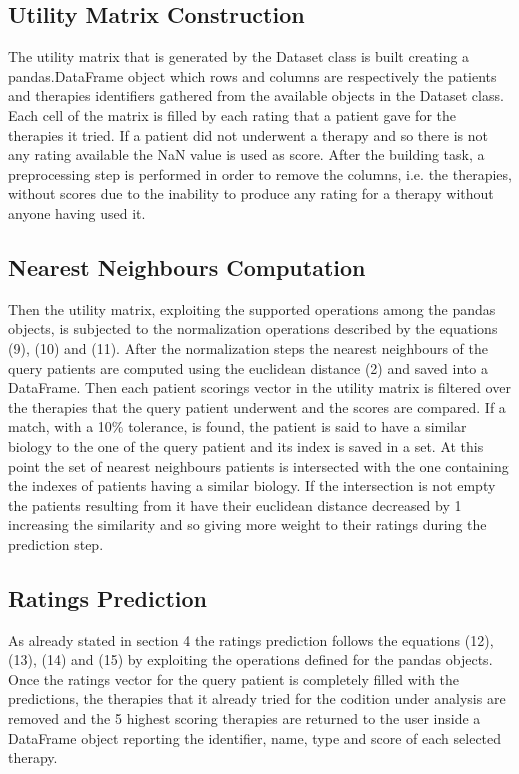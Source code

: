 \subsection{Utility Matrix Construction}
The utility matrix that is generated by the Dataset
class is built creating a pandas.DataFrame object which rows and columns are
respectively the patients and therapies identifiers gathered from the available
objects in the Dataset class.
Each cell of the matrix is filled by each rating that a patient gave for
the therapies it tried.
If a patient did not underwent a therapy and so there is not any rating
available the NaN value is used as score.
After the building task, a preprocessing step is performed in order to remove
the columns, i.e. the therapies, without scores due to the inability to produce
any rating for a therapy without anyone having used it.
\subsection{Nearest Neighbours Computation}
Then the utility matrix, exploiting the supported operations among the pandas
objects, is subjected to the normalization operations described by the
equations (9), (10) and (11).
After the normalization steps the nearest neighbours of the query patients are
computed using the euclidean distance (2) and saved into a DataFrame. Then 
each patient scorings vector in the utility matrix is filtered over the
therapies that the query patient underwent and the scores are compared. If
a match, with a 10\% tolerance, is found, the patient is said to have
a similar biology to the one of the query patient and its index is saved in a set.
At this point the set of nearest neighbours patients is intersected with the
one containing the indexes of patients having a similar biology.
If the intersection is not empty the patients resulting from it have
their euclidean distance decreased by 1 increasing the similarity and so
giving more weight to their ratings during the prediction step.
\subsection{Ratings Prediction}
As already stated in section 4 the ratings prediction follows the equations
(12), (13), (14) and (15) by exploiting the operations defined for the
pandas objects.
Once the ratings vector for the query patient is completely filled with
the predictions, the therapies that it already tried for the codition under
analysis are removed and the 5 highest scoring therapies are returned to the
user inside a DataFrame object reporting the identifier, name, type and score
of each selected therapy.
